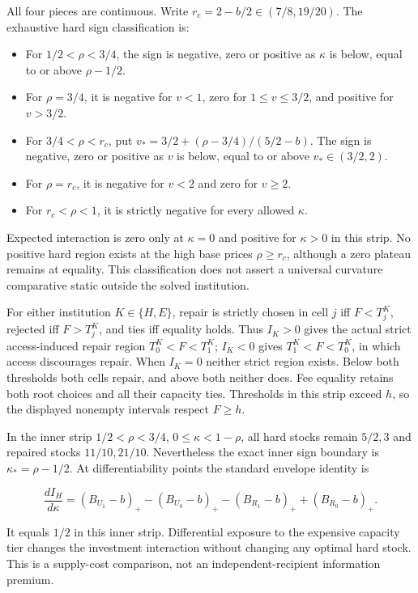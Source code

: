 \documentclass[
  11pt,
  a4paper,
]{article}
\providecommand{\tightlist}{%
  \setlength{\itemsep}{0pt}\setlength{\parskip}{0pt}}
\begin{document}
All four pieces are continuous. Write \(r_c=2-b/2\in(7/8,19/20)\). The
exhaustive hard sign classification is:

\begin{itemize}
\tightlist
\item
  For \(1/2<\rho<3/4\), the sign is negative, zero or positive as
  \(\kappa\) is below, equal to or above \(\rho-1/2\).
\item
  For \(\rho=3/4\), it is negative for \(v<1\), zero for
  \(1\leq v\leq3/2\), and positive for \(v>3/2\).
\item
  For \(3/4<\rho<r_c\), put \(v_* =3/2+(\rho-3/4)/(5/2-b)\). The sign is
  negative, zero or positive as \(v\) is below, equal to or above
  \(v_*\in(3/2,2)\).
\item
  For \(\rho=r_c\), it is negative for \(v<2\) and zero for \(v\geq2\).
\item
  For \(r_c<\rho<1\), it is strictly negative for every allowed
  \(\kappa\).
\end{itemize}

Expected interaction is zero only at \(\kappa=0\) and positive for
\(\kappa>0\) in this strip. No positive hard region exists at the high
base prices \(\rho\geq r_c\), although a zero plateau remains at
equality. This classification does not assert a universal curvature
comparative static outside the solved institution.

For either institution \(K\in\{H,E\}\), repair is strictly chosen in
cell \(j\) iff \(F<T^K_j\), rejected iff \(F>T^K_j\), and ties iff
equality holds. Thus \(I_K>0\) gives the actual strict access-induced
repair region \(T^K_0<F<T^K_1\); \(I_K<0\) gives \(T^K_1<F<T^K_0\), in
which access discourages repair. When \(I_K=0\) neither strict region
exists. Below both thresholds both cells repair, and above both neither
does. Fee equality retains both root choices and all their capacity
ties. Thresholds in this strip exceed \(h\), so the displayed nonempty
intervals respect \(F\geq h\).

In the inner strip \(1/2<\rho<3/4\), \(0\leq\kappa<1-\rho\), all hard
stocks remain \(5/2,3\) and repaired stocks \(11/10,21/10\).
Nevertheless the exact inner sign boundary is \(\kappa_*=\rho-1/2\). At
differentiability points the standard envelope identity is

\[\frac{d I_H}{d\kappa}=(B_{U_1}-b)_+-(B_{U_0}-b)_+-(B_{R_1}-b)_++(B_{R_0}-b)_+.\tag{72}\]

It equals \(1/2\) in this inner strip. Differential exposure to the
expensive capacity tier changes the investment interaction without
changing any optimal hard stock. This is a supply-cost comparison, not
an independent-recipient information premium.
\end{document}
